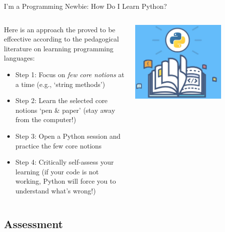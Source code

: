 \documentclass[aspectratio=1610]{beamer}
\begin{document}
\begin{frame}{I'm a Programming Newbie: How Do I Learn Python?}

	\begin{columns}
		\begin{column}{0.5\textwidth}
			Here is an approach the proved to be effcective according to the pedagogical literature on learnning programming languages:
			\begin{itemize}
				\item Step 1: Focus on \emph{few core notions} at a time (e.g., `string methods')
				\item Step 2: Learn the selected core notions `pen \& paper'  (stay away from the computer!)
				\item Step 3: Open a Python session and practice the few core notions 
				\item Step 4: Critically self-assess your learning (if your code is not working, Python will force you to understand what's wrong!)
			\end{itemize}
		\end{column}
		\begin{column}{0.5\textwidth}
			\centering
			\includegraphics[width=0.75\textwidth]{images/python_newbies.png}
		\end{column}
	\end{columns}
\end{frame}

\subsection{Assessment}
\end{document}
